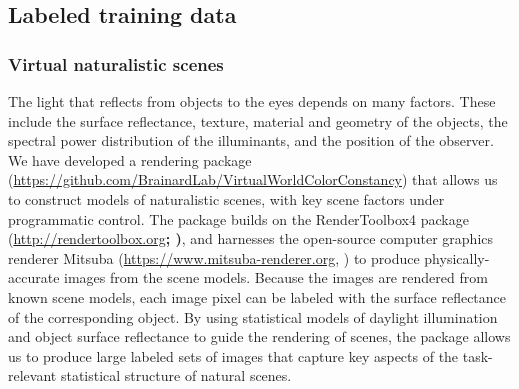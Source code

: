 \documentclass{jov}
\providecommand{\DIFaddtex}[1]{{\bf #1}} %
\providecommand{\DIFdeltex}[1]{} %
\providecommand{\DIFaddbegin}{} %
\providecommand{\DIFaddend}{} %
\providecommand{\DIFdelbegin}{} %
\providecommand{\DIFdelend}{} %
\providecommand{\DIFadd}[1]{\texorpdfstring{\DIFaddtex{#1}}{#1}} %
\providecommand{\DIFdel}[1]{\texorpdfstring{\DIFdeltex{#1}}{}} %
\newcommand{\DIFscaledelfig}{0.5}
\newlength{\DIFdelgraphicswidth} %
\newlength{\DIFdelgraphicsheight} %
\newcommand{\DIFaddincludegraphics}[2][]{{\color{blue}\fbox{\DIFOincludegraphics[#1]{#2}}}} %
\newcommand{\DIFdelincludegraphics}[2][]{%
\sbox{\DIFdelgraphicsbox}{\DIFOincludegraphics[#1]{#2}}%
\settoboxwidth{\DIFdelgraphicswidth}{\DIFdelgraphicsbox} %
\settoboxtotalheight{\DIFdelgraphicsheight}{\DIFdelgraphicsbox} %
\scalebox{\DIFscaledelfig}{%
\parbox[b]{\DIFdelgraphicswidth}{\usebox{\DIFdelgraphicsbox}\\[-\baselineskip] \rule{\DIFdelgraphicswidth}{0em}}\llap{\resizebox{\DIFdelgraphicswidth}{\DIFdelgraphicsheight}{%
\setlength{\unitlength}{\DIFdelgraphicswidth}%
\begin{picture}(1,1)%
\thicklines\linethickness{2pt} %
{\color[rgb]{1,0,0}\put(0,0){\framebox(1,1){}}}%
{\color[rgb]{1,0,0}\put(0,0){\line( 1,1){1}}}%
{\color[rgb]{1,0,0}\put(0,1){\line(1,-1){1}}}%
\end{picture}%
}\hspace*{3pt}}} %
} %
\DeclareRobustCommand{\DIFaddbegin}{\DIFOaddbegin \let\includegraphics\DIFaddincludegraphics} %
\DeclareRobustCommand{\DIFaddend}{\DIFOaddend \let\includegraphics\DIFOincludegraphics} %
\DeclareRobustCommand{\DIFdelbegin}{\DIFOdelbegin \let\includegraphics\DIFdelincludegraphics} %
\DeclareRobustCommand{\DIFdelend}{\DIFOaddend \let\includegraphics\DIFOincludegraphics} %
\begin{document}
\subsection{Labeled training data} \label{method:VirtualWorld}
\subsubsection{Virtual naturalistic scenes}
The light that reflects from objects to the eyes depends on many factors.
These include the surface reflectance, texture, material and geometry of the objects, 
the spectral power distribution of the illuminants, and the position of the observer.
We have developed a rendering package 
(\href{https://github.com/BrainardLab/VirtualWorldColorConstancy}{https://github.com/BrainardLab/VirtualWorldColorConstancy}) 
that allows us to construct models of naturalistic scenes, with key scene factors under programmatic control.
The package builds on the RenderToolbox4 package (\href{http://rendertoolbox.org}{http://rendertoolbox.org}\DIFdelbegin \DIFdel{) \cite{heasly2014rendertoolbox3}}\DIFdelend \DIFaddbegin \DIFadd{; )}\DIFaddend ,
and harnesses the open-source computer graphics renderer Mitsuba (\href{https://www.mitsuba-renderer.org}{https://www.mitsuba-renderer.org}, 
) to produce physically-accurate images from the scene models.
Because the images are rendered from known scene models, each image pixel can be labeled with 
the surface reflectance of the corresponding object.
By using statistical models of daylight illumination and object surface reflectance to guide the rendering of scenes, 
the package allows us to produce large labeled sets of images that capture key aspects of the task-relevant 
statistical structure of natural scenes.
\end{document}
